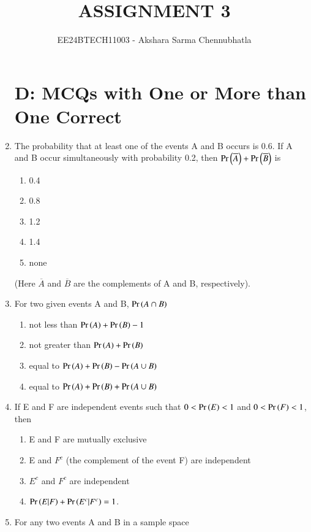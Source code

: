 \documentclass[journal,12pt,twocolumn,article]{IEEEtran}
\theoremstyle{remark}
\begin{document}
\begin{enumerate}[start = 3]

\vspace{3cm}
\title{ASSIGNMENT 3}
\author{EE24BTECH11003 - Akshara Sarma Chennubhatla}
\maketitle
\newpage
\bigskip
\section*{D: MCQs with One or More than One Correct}
\item The probability that at least one of the events A and B occurs is 0.6. If A and B occur simultaneously with probability 0.2, then $\Pr\left(\overline{A}\right)+\Pr\left(\overline{B}\right)$ is
\hfill{}
\begin{enumerate}
\item 0.4
\item 0.8
\item 1.2
\item 1.4
\item none
\end{enumerate}
(Here $\overline{A}$ and $\overline{B}$ are the complements of A and B, respectively).
\item For two given events A and B, $\Pr\left(A \cap B\right)$
\hfill{}
\begin{enumerate}
\item not less than $\Pr\left(A\right)+\Pr\left(B\right)-1$
\item not greater than $\Pr\left(A\right)+\Pr\left(B\right)$
\item equal to $\Pr\left(A\right)+\Pr\left(B\right)-\Pr\left(A \cup B\right)$
\item equal to $\Pr\left(A\right)+\Pr\left(B\right)+\Pr\left(A \cup B\right)$
\end{enumerate}
\item If E and F are independent events such that $0<\Pr\left(E\right)<1$ and $0<\Pr\left(F\right)<1$, then 
\hfill{}
\begin{enumerate}
\item E and F are mutually exclusive
\item E and $F^c$ (the complement of the event F) are independent
\item $E^c$ and $F^c$ are independent
\item $\Pr\left(E|F\right)+\Pr\left(E^c|F^c\right)=1$.
\end{enumerate}
\item For any two events A and B in a sample space
\hfill{}

\end{enumerate}
\end{document}
